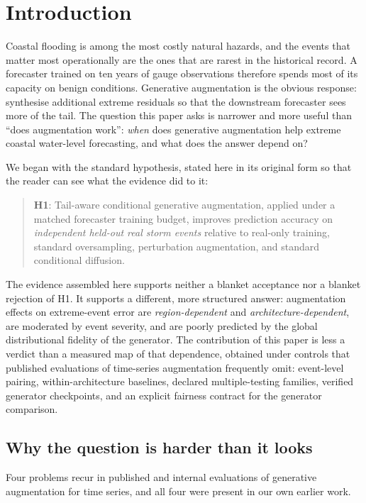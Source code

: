 \section{Introduction}

Coastal flooding is among the most costly natural hazards, and the events that
matter most operationally are the ones that are rarest in the historical
record. A forecaster trained on ten years of gauge observations therefore spends
most of its capacity on benign conditions. Generative augmentation is the
obvious response: synthesise additional extreme residuals so that the
downstream forecaster sees more of the tail. The question this paper asks is
narrower and more useful than ``does augmentation work'': \emph{when} does
generative augmentation help extreme coastal water-level forecasting, and what
does the answer depend on?

We began with the standard hypothesis, stated here in its original form so that
the reader can see what the evidence did to it:

\begin{quote}
\textbf{H1}: Tail-aware conditional generative augmentation, applied under a
matched forecaster training budget, improves prediction accuracy on
\emph{independent held-out real storm events} relative to real-only training,
standard oversampling, perturbation augmentation, and standard conditional
diffusion.
\end{quote}

The evidence assembled here supports neither a blanket acceptance nor a
blanket rejection of H1. It supports a different, more structured answer:
augmentation effects on extreme-event error are \emph{region-dependent} and
\emph{architecture-dependent}, are moderated by event severity, and are
poorly predicted by the global distributional fidelity of the generator. The
contribution of this paper is less a verdict than a measured map of that
dependence, obtained under controls that published evaluations of time-series
augmentation frequently omit: event-level pairing, within-architecture
baselines, declared multiple-testing families, verified generator
checkpoints, and an explicit fairness contract for the generator comparison.

\subsection{Why the question is harder than it looks}

Four problems recur in published and internal evaluations of generative
augmentation for time series, and all four were present in our own earlier
work.

